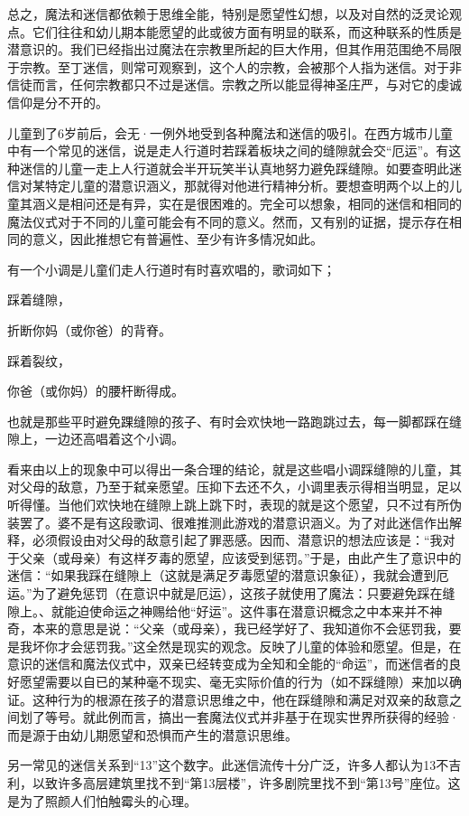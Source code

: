 \documentclass[UTF8,10pt,a4paper,openany]{book}
\begin{document}
总之，魔法和迷信都依赖于思维全能，特别是愿望性幻想，以及对自然的泛灵论观点。它们往往和幼儿期本能愿望的此或彼方面有明显的联系，而这种联系的性质是潜意识的。我们已经指出过魔法在宗教里所起的巨大作用，但其作用范围绝不局限于宗教。至丁迷信，则常可观察到，这个人的宗教，会被那个人指为迷信。对于非信徒而言，任何宗教都只不过是迷信。宗教之所以能显得神圣庄严，与对它的虔诚信仰是分不开的。

儿童到了6岁前后，会无·一例外地受到各种魔法和迷信的吸引。在西方城市儿童中有一个常见的迷信，说是走人行道时若踩着板块之间的缝隙就会交“厄运”。有这种迷信的儿童一走上人行道就会半开玩笑半认真地努力避免踩缝隙。如要查明此迷信对某特定儿童的潜意识涵义，那就得对他进行精神分析。要想查明两个以上的儿童其涵义是相问还是有异，实在是很困难的。完全可以想象，相同的迷信和相同的魔法仪式对于不同的儿童可能会有不同的意义。然而，又有别的证据，提示存在相同的意义，因此推想它有普遍性、至少有许多情况如此。

有一个小调是儿童们走人行道时有时喜欢唱的，歌词如下；

踩着缝隙，

折断你妈（或你爸）的背脊。

踩着裂纹，

你爸（或你妈）的腰杆断得成。

也就是那些平时避免踝缝隙的孩子、有时会欢快地一路跑跳过去，每一脚都踩在缝隙上，一边还高唱着这个小调。

看来由以上的现象中可以得出一条合理的结论，就是这些唱小调踩缝隙的儿童，其对父母的敌意，乃至于弑亲愿望。压抑下去还不久，小调里表示得相当明显，足以听得懂。当他们欢快地在缝隙上跳上跳下时，表现的就是这个愿望，只不过有所伪装罢了。婆不是有这段歌词、很难推测此游戏的潜意识涵义。为了对此迷信作出解释，必须假设由对父母的敌意引起了罪恶感。因而、潜意识的想法应该是：“我对于父亲（或母亲）有这样歹毒的愿望，应该受到惩罚。”于是，由此产生了意识中的迷信：“如果我踩在缝隙上（这就是满足歹毒愿望的潜意识象征），我就会遭到厄运。”为了避免惩罚（在意识中就是厄运），这孩子就使用了魔法：只要避免踩在缝隙上。、就能迫使命运之神赐给他“好运”。这件事在潜意识概念之中本来并不神奇，本来的意思是说：“父亲（或母亲），我已经学好了、我知道你不会惩罚我，要是我坏你才会惩罚我。”这全然是现实的观念。反映了儿童的体验和愿望。但是，在意识的迷信和魔法仪式中，双亲已经转变成为全知和全能的“命运”，而迷信者的良好愿望需要以自已的某种毫不现实、毫无实际价值的行为（如不踩缝隙）来加以确证。这种行为的根源在孩子的潜意识思维之中，他在踩缝隙和满足对双亲的敌意之间划了等号。就此例而言，搞出一套魔法仪式并非基于在现实世界所获得的经验·而是源于由幼儿期愿望和恐惧而产生的潜意识思维。

另一常见的迷信关系到“13”这个数字。此迷信流传十分广泛，许多人都认为13不吉利，以致许多高层建筑里找不到“第13层楼”，许多剧院里找不到“第13号”座位。这是为了照颜人们怕触霉头的心理。
\end{document}
